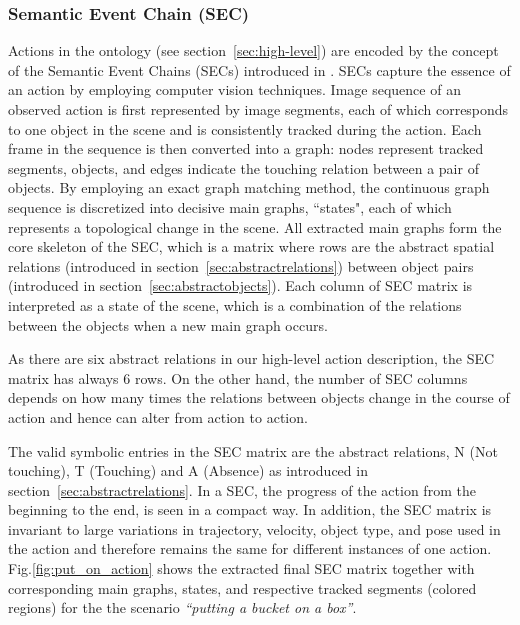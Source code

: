 \subsubsection{Semantic Event Chain (SEC)}
\label{sec:SEC}

Actions in the ontology (see section~\ref{sec:high-level}) are encoded by  the concept of the Semantic Event Chains (SECs) introduced in \cite{Aksoy2011}. 
SECs capture the essence of an action by employing computer vision techniques. Image sequence of an observed action is first represented by image segments, each of which corresponds to one object in the scene and is consistently tracked during the action. Each frame in the sequence is then converted into a graph: nodes represent tracked segments, \ie objects, and edges indicate the touching relation between a pair of objects.  	
By employing an exact graph matching method, the continuous graph sequence is discretized into decisive main graphs, \ie ``states", each of which represents a topological change in the scene. 
All extracted main graphs form the core skeleton of the SEC, which is a matrix where rows are the abstract spatial relations (introduced in section~\ref{sec:abstractrelations}) between object pairs (introduced in section~\ref{sec:abstractobjects}).
Each column of SEC matrix is interpreted as a state of the scene, which is a combination of the relations between the objects when a new main graph occurs. 


As there are six abstract relations in our high-level action description, the SEC matrix has always $6$ rows.
On the other hand, the number of SEC columns depends on how many times the relations between objects change in the course of action and hence can alter from action to action.

The valid symbolic entries in the SEC matrix are the abstract relations, \ie N (Not touching), T (Touching) and A (Absence) as introduced in section~\ref{sec:abstractrelations}. In a SEC, the progress of the action from the beginning to the end, is seen in a compact way.
In addition, the SEC matrix is invariant to large variations in trajectory, velocity, object type, and pose used in the action and therefore remains the same for different instances of one action.
Fig.\ref{fig:put_on_action} shows the extracted final SEC matrix together with corresponding main graphs, \ie states, and respective tracked segments (colored regions) for the the scenario {\it ``putting a bucket on a box''}.



